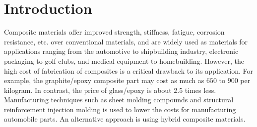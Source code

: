 \documentclass[USenglish,twocolumn]{article}
\begin{document}
\section{Introduction}
Composite materials offer improved strength, stiffness, fatigue, corrosion resistance, etc. over
conventional materials, and are widely used as materials for applications ranging from the automotive to shipbuilding
industry, electronic packaging to golf clubs, and medical equipment to homebuilding. However, the high
cost of fabrication of composites is a critical drawback to its application. For example, the
graphite/epoxy composite part may cost as much as $650$ to $900$ per kilogram. In contrast, the price
of glass/epoxy is about 2.5 times less. Manufacturing techniques such as sheet molding compounds and
structural reinforcement injection molding is used to lower the  costs for manufacturing automobile parts.
An alternative approach is using hybrid composite materials.
\end{document}
